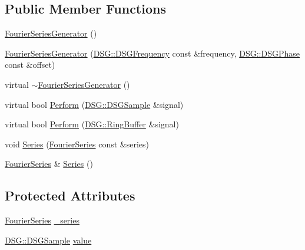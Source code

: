 \subsection*{Public Member Functions}
\begin{DoxyCompactItemize}
\item 
\hyperlink{class_d_s_g_1_1_fourier_1_1_fourier_series_generator_a0b73d1fc587d7d22464294b6276c2ec7}{Fourier\+Series\+Generator} ()
\item 
\hyperlink{class_d_s_g_1_1_fourier_1_1_fourier_series_generator_a9227438eb78f40b656ae4f6880fba7d8}{Fourier\+Series\+Generator} (\hyperlink{namespace_d_s_g_a4315a061386fa1014fda09b15d3a6973}{D\+S\+G\+::\+D\+S\+G\+Frequency} const \&frequency, \hyperlink{namespace_d_s_g_a44431ce1eb0a7300efdd207bc879e52c}{D\+S\+G\+::\+D\+S\+G\+Phase} const \&offset)
\item 
virtual \hyperlink{class_d_s_g_1_1_fourier_1_1_fourier_series_generator_a6e5b0a582b040035a47a0855456d71c1}{$\sim$\+Fourier\+Series\+Generator} ()
\item 
virtual bool \hyperlink{class_d_s_g_1_1_fourier_1_1_fourier_series_generator_aa4768d44397b5fab5a30cb86068e161a}{Perform} (\hyperlink{namespace_d_s_g_ac39a94cd27ebcd9c1e7502d0c624894a}{D\+S\+G\+::\+D\+S\+G\+Sample} \&signal)
\item 
virtual bool \hyperlink{class_d_s_g_1_1_fourier_1_1_fourier_series_generator_adce79a239104570f8a6565e708fb70a7}{Perform} (\hyperlink{class_d_s_g_1_1_ring_buffer}{D\+S\+G\+::\+Ring\+Buffer} \&signal)
\item 
void \hyperlink{class_d_s_g_1_1_fourier_1_1_fourier_series_generator_a69b6556f53c7241e37144f5d88381fb7}{Series} (\hyperlink{class_d_s_g_1_1_fourier_1_1_fourier_series_generator_a32ffe02b67ac07db92ad41e3ee366c94}{Fourier\+Series} const \&series)
\item 
\hyperlink{class_d_s_g_1_1_fourier_1_1_fourier_series_generator_a32ffe02b67ac07db92ad41e3ee366c94}{Fourier\+Series} \& \hyperlink{class_d_s_g_1_1_fourier_1_1_fourier_series_generator_a4ed12eb61fe931ceceaeb59a2986a147}{Series} ()
\end{DoxyCompactItemize}
\subsection*{Protected Attributes}
\begin{DoxyCompactItemize}
\item 
\hyperlink{class_d_s_g_1_1_fourier_1_1_fourier_series_generator_a32ffe02b67ac07db92ad41e3ee366c94}{Fourier\+Series} \hyperlink{class_d_s_g_1_1_fourier_1_1_fourier_series_generator_ac66c0907c6daa57f0e33f6b82cc7131d}{\+\_\+series}
\item 
\hyperlink{namespace_d_s_g_ac39a94cd27ebcd9c1e7502d0c624894a}{D\+S\+G\+::\+D\+S\+G\+Sample} \hyperlink{class_d_s_g_1_1_fourier_1_1_fourier_series_generator_a1785e78e21decfc65f650a5e3a435ed8}{value}
\end{DoxyCompactItemize}

